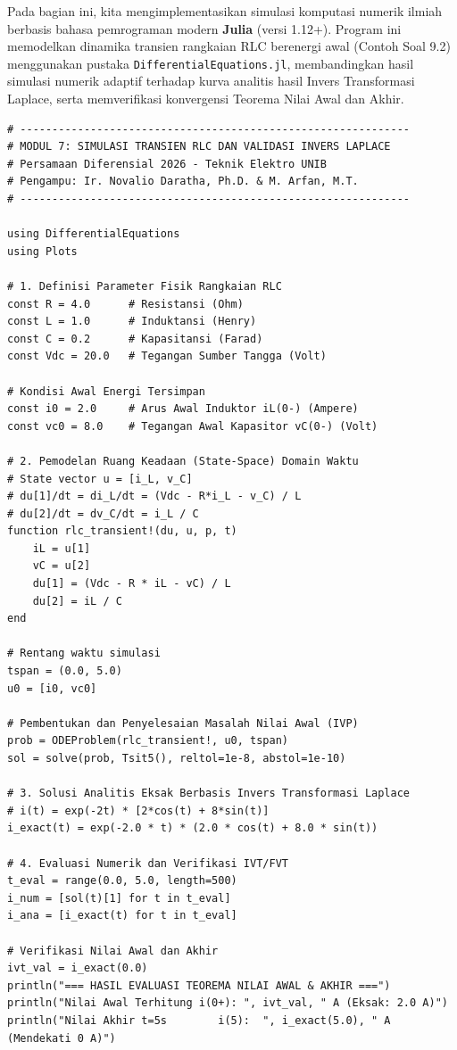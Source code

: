 \documentclass[11pt,a4paper]{article}
\theoremstyle{definition}
\begin{document}
Pada bagian ini, kita mengimplementasikan simulasi komputasi numerik ilmiah berbasis bahasa pemrograman modern \textbf{Julia} (versi 1.12+). Program ini memodelkan dinamika transien rangkaian RLC berenergi awal (Contoh Soal 9.2) menggunakan pustaka \texttt{DifferentialEquations.jl}, membandingkan hasil simulasi numerik adaptif terhadap kurva analitis hasil Invers Transformasi Laplace, serta memverifikasi konvergensi Teorema Nilai Awal dan Akhir.

\begin{lstlisting}[style=juliastyle, caption={Skrip Julia untuk simulasi transien RLC dan validasi Invers Laplace.}, label={lst:julia_rlc_laplace}]
# -------------------------------------------------------------
# MODUL 7: SIMULASI TRANSIEN RLC DAN VALIDASI INVERS LAPLACE
# Persamaan Diferensial 2026 - Teknik Elektro UNIB
# Pengampu: Ir. Novalio Daratha, Ph.D. & M. Arfan, M.T.
# -------------------------------------------------------------

using DifferentialEquations
using Plots

# 1. Definisi Parameter Fisik Rangkaian RLC
const R = 4.0      # Resistansi (Ohm)
const L = 1.0      # Induktansi (Henry)
const C = 0.2      # Kapasitansi (Farad)
const Vdc = 20.0   # Tegangan Sumber Tangga (Volt)

# Kondisi Awal Energi Tersimpan
const i0 = 2.0     # Arus Awal Induktor iL(0-) (Ampere)
const vc0 = 8.0    # Tegangan Awal Kapasitor vC(0-) (Volt)

# 2. Pemodelan Ruang Keadaan (State-Space) Domain Waktu
# State vector u = [i_L, v_C]
# du[1]/dt = di_L/dt = (Vdc - R*i_L - v_C) / L
# du[2]/dt = dv_C/dt = i_L / C
function rlc_transient!(du, u, p, t)
    iL = u[1]
    vC = u[2]
    du[1] = (Vdc - R * iL - vC) / L
    du[2] = iL / C
end

# Rentang waktu simulasi
tspan = (0.0, 5.0)
u0 = [i0, vc0]

# Pembentukan dan Penyelesaian Masalah Nilai Awal (IVP)
prob = ODEProblem(rlc_transient!, u0, tspan)
sol = solve(prob, Tsit5(), reltol=1e-8, abstol=1e-10)

# 3. Solusi Analitis Eksak Berbasis Invers Transformasi Laplace
# i(t) = exp(-2t) * [2*cos(t) + 8*sin(t)]
i_exact(t) = exp(-2.0 * t) * (2.0 * cos(t) + 8.0 * sin(t))

# 4. Evaluasi Numerik dan Verifikasi IVT/FVT
t_eval = range(0.0, 5.0, length=500)
i_num = [sol(t)[1] for t in t_eval]
i_ana = [i_exact(t) for t in t_eval]

# Verifikasi Nilai Awal dan Akhir
ivt_val = i_exact(0.0)
println("=== HASIL EVALUASI TEOREMA NILAI AWAL & AKHIR ===")
println("Nilai Awal Terhitung i(0+): ", ivt_val, " A (Eksak: 2.0 A)")
println("Nilai Akhir t=5s        i(5):  ", i_exact(5.0), " A (Mendekati 0 A)")


\end{lstlisting}
\end{document}
